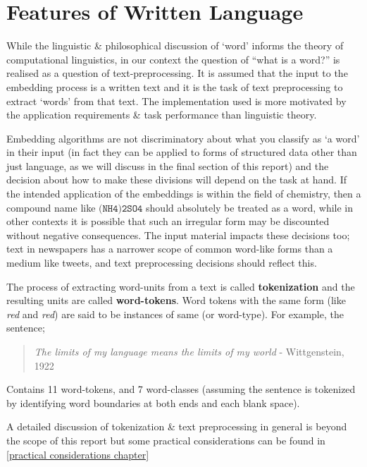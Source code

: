 \section{Features of Written Language}
While the linguistic \& philosophical discussion of `word' informs the theory of computational linguistics, in our context the question of ``what is a word?'' is realised as a question of text-preprocessing. It is assumed that the input to the embedding process is a written text and it is the task of text preprocessing to extract `words' from that text. The implementation used is more motivated by the application requirements \& task performance than linguistic theory.

Embedding algorithms are not discriminatory about what you classify as `a word' in their input (in fact they can be applied to forms of structured data other than just language, as we will discuss in the final section of this report) and the decision about how to make these divisions will depend on the task at hand. If the intended application of the embeddings is within the field of chemistry, then a compound name like $\texttt{(NH4)2SO4}$ should absolutely be treated as a word, while in other contexts it is possible that such an irregular form may be discounted without negative consequences. The input material impacts these decisions too; text in newspapers has a narrower scope of common word-like forms than a medium like tweets, and text preprocessing decisions should reflect this.

The process of extracting word-units from a text is called \textbf{tokenization} and the resulting units are called \textbf{word-tokens}. Word tokens with the same form (like \emph{red} and \emph{red}) are said to be instances of same  (or word-type). For example, the sentence;

\begin{quote}
  \emph{The limits of my language means the limits of my world} - Wittgenstein, 1922
\end{quote}

Contains 11 word-tokens, and 7 word-classes (assuming the sentence is tokenized by identifying word boundaries at both ends and each blank space).

A detailed discussion of tokenization \& text preprocessing in general is beyond the scope of this report but some practical considerations can be found in \autoref{practical considerations chapter}
